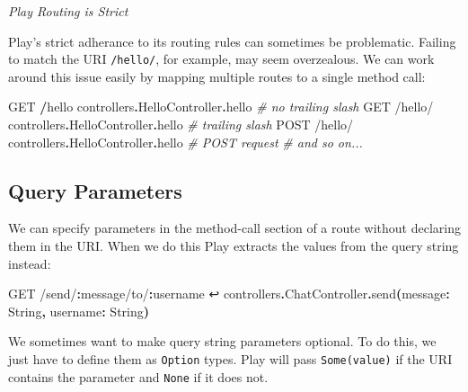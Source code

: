 \documentclass[oneside,11pt,a4paper,]{book}
\newenvironment{Shaded}{\begin{snugshade}}{\end{snugshade}}
\newcommand{\KeywordTok}[1]{\textcolor[rgb]{0.13,0.29,0.53}{\textbf{{#1}}}}
\newcommand{\StringTok}[1]{\textcolor[rgb]{0.31,0.60,0.02}{{#1}}}
\newcommand{\CommentTok}[1]{\textcolor[rgb]{0.56,0.35,0.01}{\textit{{#1}}}}
\newcommand{\OtherTok}[1]{\textcolor[rgb]{0.56,0.35,0.01}{{#1}}}
\newcommand{\NormalTok}[1]{{#1}}
\begin{document}
\begin{InfoCallout}

\emph{Play Routing is Strict}

Play's strict adherance to its routing rules can sometimes be
problematic. Failing to match the URI \texttt{/hello/}, for example, may
seem overzealous. We can work around this issue easily by mapping
multiple routes to a single method call:

\begin{Shaded}
\begin{Highlighting}[]
\NormalTok{GET  }\KeywordTok{/}\NormalTok{hello  controllers}\KeywordTok{.}\NormalTok{HelloController}\KeywordTok{.}\NormalTok{hello }\CommentTok{# no trailing slash}
\NormalTok{GET  }\StringTok{/hello/} \NormalTok{controllers}\KeywordTok{.}\NormalTok{HelloController}\KeywordTok{.}\NormalTok{hello }\CommentTok{# trailing slash}
\NormalTok{POST }\StringTok{/hello/} \NormalTok{controllers}\KeywordTok{.}\NormalTok{HelloController}\KeywordTok{.}\NormalTok{hello }\CommentTok{# POST request}
\CommentTok{# and so on...}
\end{Highlighting}
\end{Shaded}

\end{InfoCallout}

\subsection{Query Parameters}\label{query-parameters}

We can specify parameters in the method-call section of a route without
declaring them in the URI. When we do this Play extracts the values from
the query string instead:

\begin{Shaded}
\begin{Highlighting}[]
\NormalTok{GET }\StringTok{/send/}\KeywordTok{:}\NormalTok{message}\StringTok{/to/}\KeywordTok{:}\NormalTok{username ↩}
  \NormalTok{controllers}\KeywordTok{.}\NormalTok{ChatController}\KeywordTok{.}\NormalTok{send}\KeywordTok{(}\NormalTok{message}\KeywordTok{:} \OtherTok{String}\KeywordTok{,} \NormalTok{username}\KeywordTok{:} \OtherTok{String}\KeywordTok{)}
\end{Highlighting}
\end{Shaded}

We sometimes want to make query string parameters optional. To do this,
we just have to define them as \texttt{Option} types. Play will pass
\texttt{Some(value)} if the URI contains the parameter and \texttt{None}
if it does not.
\end{document}

